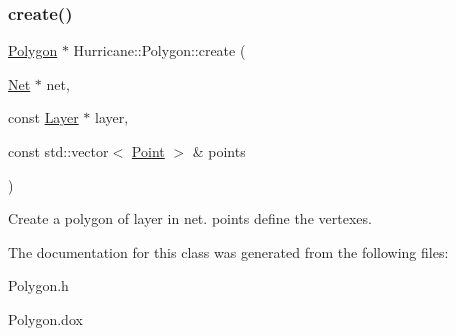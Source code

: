 \subsubsection{\texorpdfstring{create()}{create()}}
{\footnotesize\ttfamily \mbox{\hyperlink{classHurricane_1_1Polygon}{Polygon}} $\ast$ Hurricane\+::\+Polygon\+::create (\begin{DoxyParamCaption}\item[{\mbox{\hyperlink{classHurricane_1_1Net}{Net}} $\ast$}]{net,  }\item[{const \mbox{\hyperlink{classHurricane_1_1Layer}{Layer}} $\ast$}]{layer,  }\item[{const std\+::vector$<$ \mbox{\hyperlink{classHurricane_1_1Point}{Point}} $>$ \&}]{points }\end{DoxyParamCaption})\hspace{0.3cm}{\ttfamily [static]}}

Create a polygon of {\ttfamily layer} in {\ttfamily net}. {\ttfamily points} define the vertexes. 

The documentation for this class was generated from the following files\+:\begin{DoxyCompactItemize}
\item 
Polygon.\+h\item 
Polygon.\+dox\end{DoxyCompactItemize}
